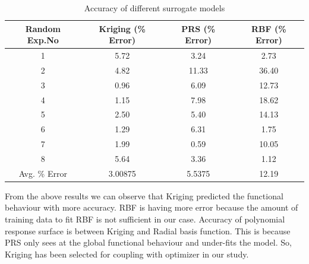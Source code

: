 \begin{table}[H]
	\caption{Accuracy of different surrogate models}
	\label{Accuracy of different surrogate models}
	\centering
	\begin{tabular}{cccc}
		\hline \hline
		Random Exp.No	&Kriging (\% Error)	&PRS (\% Error)	&RBF (\% Error) \\
		\hline \hline
		1 &5.72 &3.24	&2.73 \\
		2 &4.82	&11.33	&36.40 \\
		3 &0.96	&6.09	&12.73 \\
		4 &1.15	&7.98	&18.62 \\
		5 &2.50	&5.40	&14.13 \\
		6 &1.29	&6.31	&1.75 \\
		7 &1.99	&0.59	&10.05 \\
		8 &5.64	&3.36	&1.12 \\
		\hline \hline
		Avg. \% Error	& 3.00875	& 5.5375	& 12.19 \\
		\hline \hline
	\end{tabular}
\end{table}


From the above results we can observe that Kriging predicted the functional behaviour with more accuracy. RBF is having more error because the amount of training data to fit RBF is not sufficient in our case. Accuracy of polynomial response surface is between Kriging and Radial basis function. This is because PRS only sees at the global functional behaviour and under-fits the model. So, Kriging has been selected for coupling with optimizer in our study.

